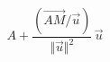 \begin{displaymath}
 A + \frac{(\overrightarrow{AM}/\overrightarrow{u})}{\Vert \overrightarrow u \Vert ^2}\, \overrightarrow u
\end{displaymath}
